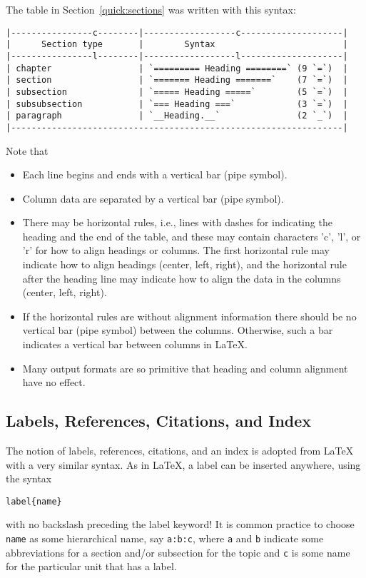 \documentclass[twoside]{article}
\begin{document}
The table in Section~\ref{quick:sections} was written with this
syntax:
\begin{Verbatim}
|----------------c--------|------------------c--------------------|
|      Section type       |        Syntax                         |
|----------------l--------|------------------l--------------------|
| chapter                 | `========= Heading ========` (9 `=`)  |
| section                 | `======= Heading =======`    (7 `=`)  |
| subsection              | `===== Heading =====`        (5 `=`)  |
| subsubsection           | `=== Heading ===`            (3 `=`)  |
| paragraph               | `__Heading.__`               (2 `_`)  |
|-----------------------------------------------------------------|
\end{Verbatim}

Note that

\begin{itemize}
 \item Each line begins and ends with a vertical bar (pipe symbol).

 \item Column data are separated by a vertical bar (pipe symbol).

 \item There may be horizontal rules, i.e., lines with dashes for
   indicating the heading and the end of the table, and these may
   contain characters 'c', 'l', or 'r' for how to align headings or
   columns. The first horizontal rule may indicate how to align
   headings (center, left, right), and the horizontal rule after the
   heading line may indicate how to align the data in the columns
   (center, left, right).

 \item If the horizontal rules are without alignment information there should
   be no vertical bar (pipe symbol) between the columns. Otherwise, such
   a bar indicates a vertical bar between columns in {\LaTeX}.

 \item Many output formats are so primitive that heading and column alignment
   have no effect.
\end{itemize}

\noindent

\subsection{Labels, References, Citations, and Index}

The notion of labels, references, citations, and an index is adopted
from {\LaTeX} with a very similar syntax. As in {\LaTeX}, a label can be
inserted anywhere, using the syntax
\begin{Verbatim}
label{name}
\end{Verbatim}
with no backslash
preceding the label keyword! It is common practice to choose {\fontsize{10pt}{10pt}\verb!name!}
as some hierarchical name, say {\fontsize{10pt}{10pt}\verb!a:b:c!}, where {\fontsize{10pt}{10pt}\verb!a!} and {\fontsize{10pt}{10pt}\verb!b!} indicate
some abbreviations for a section and/or subsection for the topic and
{\fontsize{10pt}{10pt}\verb!c!} is some name for the particular unit that has a label.
\end{document}
